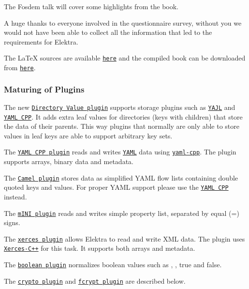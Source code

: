 The Fosdem talk will cover some highlights from the book.

A huge thanks to everyone involved in the questionnaire survey, without you we would not have been able to collect all the information that led to the requirements for Elektra.

The La\+TeX sources are available \href{https://book.libelektra.org}{\tt here} and the compiled book can be downloaded from \href{https://www.libelektra.org/ftp/elektra/publications/raab2017context.pdf}{\tt here}.

\subsubsection*{Maturing of Plugins}


\begin{DoxyItemize}
\item The new \href{https://www.libelektra.org/plugins/directoryvalue}{\tt Directory Value plugin} supports storage plugins such as \href{https://www.libelektra.org/plugins/yajl}{\tt Y\+A\+JL} and \href{https://www.libelektra.org/plugins/yamlcpp}{\tt Y\+A\+ML C\+PP}. It adds extra leaf values for directories (keys with children) that store the data of their parents. This way plugins that normally are only able to store values in leaf keys are able to support arbitrary key sets.
\item The \href{https://www.libelektra.org/plugins/yamlcpp}{\tt Y\+A\+ML C\+PP plugin} reads and writes \href{http://yaml.org}{\tt Y\+A\+ML} data using \href{https://github.com/jbeder/yaml-cpp}{\tt yaml-\/cpp}. The plugin supports arrays, binary data and metadata.
\item The \href{https://www.libelektra.org/plugins/camel}{\tt Camel plugin} stores data as simplified Y\+A\+ML flow lists containing double quoted keys and values. For proper Y\+A\+ML support please use the \href{https://www.libelektra.org/plugins/yamlcpp}{\tt Y\+A\+ML C\+PP} instead.
\item The \href{https://www.libelektra.org/plugins/mini}{\tt m\+I\+NI plugin} reads and writes simple property list, separated by equal ({\ttfamily =}) signs.
\item The \href{https://www.libelektra.org/plugins/xerces}{\tt xerces plugin} allows Elektra to read and write X\+ML data. The plugin uses \href{http://xerces.apache.org/xerces-c}{\tt Xerces-\/\+C++} for this task. It supports both arrays and metadata.
\item The \href{https://www.libelektra.org/plugins/boolean}{\tt boolean plugin} normalizes boolean values such as {}, {}, {\ttfamily true} and {\ttfamily false}.
\item The \href{https://www.libelektra.org/plugins/crypto}{\tt crypto plugin} and \href{https://www.libelektra.org/plugins/fcrypt}{\tt fcrypt plugin} are described below.
\end{DoxyItemize}

